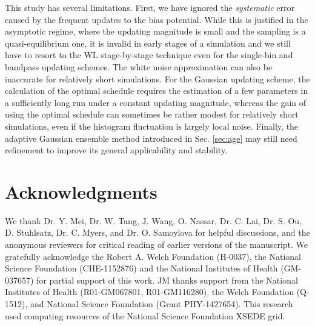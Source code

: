 \documentclass[reprint, superscriptaddress, floatfix]{revtex4-1}
\begin{document}
This study has several limitations.
%
First, we have ignored the \emph{systematic}
error\cite{zhou2005, morozov2007, zhou2008}
caused by the frequent updates to the bias potential.
%
While this is justified in the asymptotic regime,
where the updating magnitude is small
and the sampling is a quasi-equilibrium one,\cite{
  zhou2005, morozov2007, zhou2008, barducci2008, dama2014}
it is invalid in
early stages of a simulation
and we still have to resort to the WL stage-by-stage
technique even for the single-bin and bandpass updating schemes.
%
The white noise approximation
can also be inaccurate for relatively short simulations.
%
For the Gaussian updating scheme,
the calculation of the optimal schedule requires
the estimation of a few parameters
in a sufficiently long run
under a constant updating magnitude,
whereas the gain of using the optimal schedule
can sometimes be rather modest
for relatively short simulations,
even if the histogram fluctuation is largely
local noise.
%
Finally, the adaptive Gaussian ensemble method
introduced in Sec. \ref{sec:age} may still need refinement
to improve its general applicability and stability.


\section{Acknowledgments}

We thank Dr. Y. Mei, Dr. W. Tang, J. Wang,
O. Nassar, Dr. C. Lai, Dr. S. Ou, D. Stuhlsatz,
Dr. C. Myers, and Dr. O. Samoylova
for helpful discussions,
and the anonymous reviewers for critical reading
of earlier versions of the manuscript.
%
We gratefully acknowledge the Robert A. Welch Foundation (H-0037),
the National Science Foundation (CHE-1152876)
and the National Institutes of Health (GM-037657)
for partial support of this work.
%
JM thanks support from the National Institutes of Health
(R01-GM067801, R01-GM116280),
the Welch Foundation (Q-1512),
and National Science Foundation (Grant PHY-1427654).
%
This research used computing resources of
the National Science Foundation XSEDE grid.
%
\end{document}
